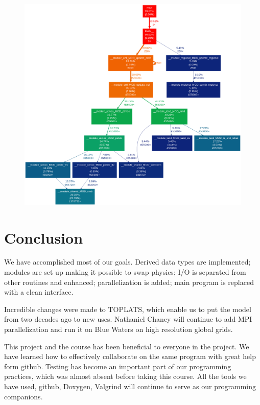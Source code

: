 \documentclass[pdftex,12pt,a4paper]{article}
\begin{document}
\begin{figure}[h]
	\includegraphics[width=5.5in]{Figures/CallGraph.png}
	\label{Profiling1}
	\caption{}
\end{figure}

\section{Conclusion}

We have accomplished most of our goals. Derived data types are implemented; modules are set up making it possible to swap physics; I/O is separated from other routines and enhanced; parallelization is added; main program is replaced with a clean interface. 

Incredible changes were made to TOPLATS, which enable us to put the model from two decades ago to new uses. Nathaniel Chaney will continue to add MPI parallelization and run it on Blue Waters on high resolution global grids. 

This project and the course has been beneficial to everyone in the project. We have learned how to effectively collaborate on the same program with great help form github. Testing has become an important part of our programming practices, which was almost absent before taking this course. All the tools we have used, github, Doxygen, Valgrind will continue to serve as our programming companions.
\end{document}
